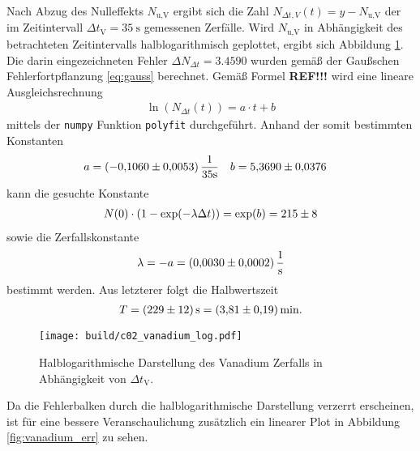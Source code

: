 \noindent
Nach Abzug des Nulleffekts $N_\text{u,V}$ ergibt sich die Zahl $N_{\Delta t,V}(t) = y- N_\text{u,V}$ der im Zeitintervall $\Delta t_\text{V} = \qty[]{35}{\second}$
gemessenen Zerfälle.
Wird $N_\text{u,V}$ in Abhängigkeit des betrachteten Zeitintervalls halblogarithmisch geplottet, ergibt sich Abbildung \ref{fig:vanadium_log}.
Die darin eingezeichneten Fehler $\Delta N_{\Delta t} = \num[]{3.4590}$ wurden gemäß der Gaußschen Fehlerfortpflanzung \eqref{eq:gauss} berechnet.
Gemäß Formel \textbf{REF!!!} wird eine lineare Ausgleichsrechnung 
\begin{align}
    \ln\left(N_{\Delta t}(t)\right) = a \cdot t + b
    \label{eq:linear_eq}
\end{align}
mittels der \texttt{numpy} \cite[]{numpy} Funktion \texttt{polyfit} durchgeführt.
Anhand der somit bestimmten Konstanten
\begin{align*}
    a &= (\num{-0.1060 +- 0.0053}) \, \frac{1}{35 \unit{\second}}  & b &= \num{5.3690 +- 0.0376}
\end{align*}
kann die gesuchte Konstante 
\begin{align}
    N(0) \cdot \left(1- \exp(- \lambda \Delta t)\right) = \exp(b) = \num[]{215 +- 8}
\end{align}
sowie die Zerfallskonstante 
\begin{align}
    \lambda = - a = \qty[]{0.0030+-0.0002}{\per\second}
\end{align}
bestimmt werden.
Aus letzterer folgt die Halbwertszeit 
\begin{align}
    T = \qty[]{229 +- 12}{\second} = \qty[]{3.81 +- 0.19}{\minute}.
\end{align}


\begin{figure}[H]
    \centering
    \texttt{[image: build/c02\_vanadium\_log.pdf]}
    \caption[]{Halblogarithmische Darstellung des Vanadium Zerfalls in Abhängigkeit von $\Delta t_\text{V}$.}
    \label{fig:vanadium_log}
\end{figure}

\noindent
Da die Fehlerbalken durch die halblogarithmische Darstellung verzerrt erscheinen, ist für eine bessere Veranschaulichung zusätzlich ein linearer
Plot in Abbildung \ref{fig:vanadium_err} zu sehen.

